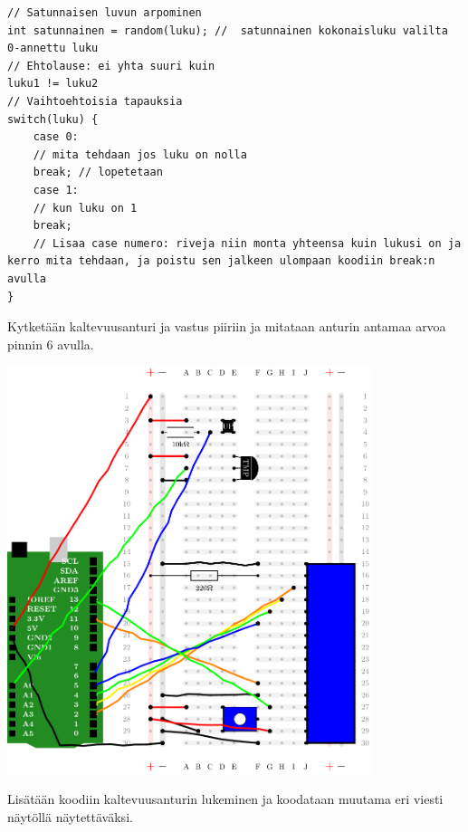 \begin{tcolorbox}[colback=white,title=Vinkkejä Arduinolla koodaamiseen!,colbacktitle=purple!90,breakable]
\begin{lstlisting}
// Satunnaisen luvun arpominen
int satunnainen = random(luku); //  satunnainen kokonaisluku valilta 0-annettu luku
// Ehtolause: ei yhta suuri kuin
luku1 != luku2
// Vaihtoehtoisia tapauksia
switch(luku) {
    case 0:
    // mita tehdaan jos luku on nolla
    break; // lopetetaan
    case 1: 
    // kun luku on 1
    break;
    // Lisaa case numero: riveja niin monta yhteensa kuin lukusi on ja kerro mita tehdaan, ja poistu sen jalkeen ulompaan koodiin break:n avulla
}
\end{lstlisting}
\end{tcolorbox}


Kytketään kaltevuusanturi ja vastus piiriin ja mitataan anturin antamaa arvoa pinnin 6 avulla. 

\includegraphics[width=0.8\textwidth]{kuvat/kuva25.pdf}


\clearpage
Lisätään koodiin kaltevuusanturin lukeminen ja koodataan muutama eri viesti näytöllä näytettäväksi.

